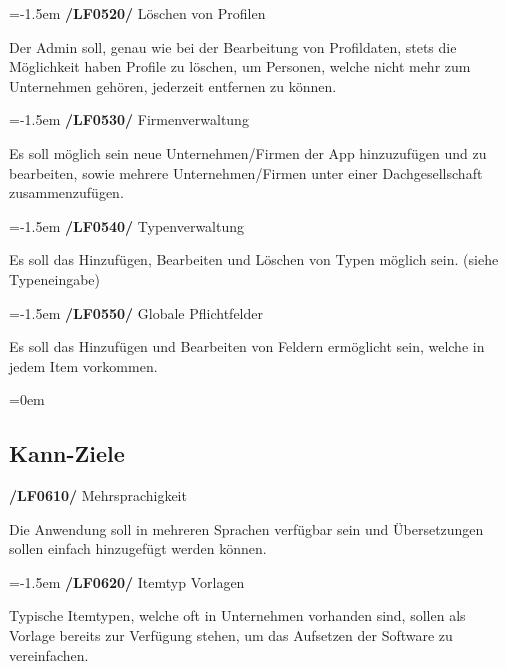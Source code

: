 \documentclass[11pt,a4paper]{report}
\begin{document}
\leftskip=-1.5em
\textbf{/LF0520/} Löschen von Profilen
\par
\begingroup
\leftskip=1cm
\noindent Der Admin soll, genau wie bei der Bearbeitung von Profildaten, stets die Möglichkeit haben Profile zu löschen, um Personen, welche nicht mehr zum Unternehmen gehören, jederzeit entfernen zu können.\\
\par
\endgroup

\leftskip=-1.5em
\textbf{/LF0530/} Firmenverwaltung
\par
\begingroup
\leftskip=1cm
\noindent Es soll möglich sein neue Unternehmen/Firmen der App hinzuzufügen und zu bearbeiten, sowie mehrere Unternehmen/Firmen unter einer Dachgesellschaft zusammenzufügen.\\
\par
\endgroup

\leftskip=-1.5em
\textbf{/LF0540/} Typenverwaltung
\par
\begingroup
\leftskip=1cm
\noindent Es soll das Hinzufügen, Bearbeiten und Löschen von Typen möglich sein. (siehe Typeneingabe)\\
\par
\endgroup

\leftskip=-1.5em
\textbf{/LF0550/} Globale Pflichtfelder
\par
\begingroup
\leftskip=1cm
\noindent Es soll das Hinzufügen und Bearbeiten von Feldern ermöglicht sein, welche in jedem Item vorkommen.\\
\par
\endgroup

\leftskip=0em
\subsection{Kann-Ziele}

\textbf{/LF0610/} Mehrsprachigkeit
\par
\begingroup
\leftskip=1cm
\noindent Die Anwendung soll in mehreren Sprachen verfügbar sein und Übersetzungen sollen einfach hinzugefügt werden können.\\
\par
\endgroup

\leftskip=-1.5em
\textbf{/LF0620/} Itemtyp Vorlagen
\par
\begingroup
\leftskip=1cm
\noindent Typische Itemtypen, welche oft in Unternehmen vorhanden sind,
sollen als Vorlage bereits zur Verfügung stehen, um das Aufsetzen der Software zu vereinfachen.\\
\par
\endgroup
\end{document}
